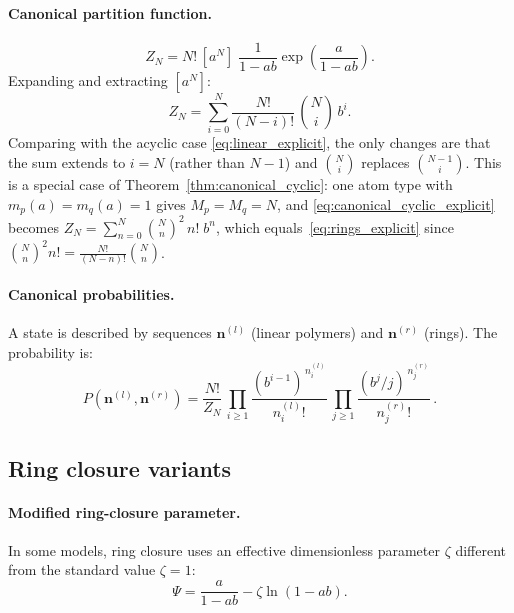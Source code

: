 \documentclass[11pt]{amsart}
\newcommand{\GFensemble}{Z}
\newcommand{\GFcomb}{\Psi}
\theoremstyle{definition}
\theoremstyle{plain}
\theoremstyle{remark}
\begin{document}
\paragraph{Canonical partition function.}
\begin{equation}\label{eq:rings_partition}
\GFensemble_N = N!\,[a^N]\;\frac{1}{1-ab}\exp\!\left(\frac{a}{1-ab}\right).
\end{equation}
Expanding and extracting $[a^N]$:
\begin{equation}\label{eq:rings_explicit}
\GFensemble_N
=
\sum_{i=0}^{N}\frac{N!}{(N-i)!}\,\binom{N}{i}\,b^i.
\end{equation}
Comparing with the acyclic case \eqref{eq:linear_explicit}, the only changes are that the sum extends to $i=N$ (rather than $N-1$) and $\binom{N}{i}$ replaces $\binom{N-1}{i}$.
This is a special case of Theorem~\ref{thm:canonical_cyclic}: one atom type with $m_p(a)=m_q(a)=1$ gives $M_p=M_q=N$, and \eqref{eq:canonical_cyclic_explicit} becomes $\GFensemble_N = \sum_{n=0}^{N}\binom{N}{n}^2\,n!\;b^n$, which equals~\eqref{eq:rings_explicit} since $\binom{N}{n}^2 n! = \frac{N!}{(N-n)!}\binom{N}{n}$.

\paragraph{Canonical probabilities.}
A state is described by sequences $\mathbf{n}^{(l)}$ (linear polymers) and $\mathbf{n}^{(r)}$ (rings).
The probability is:
\[
P(\mathbf{n}^{(l)},\mathbf{n}^{(r)})
= \frac{N!}{\GFensemble_N}\,
\prod_{i\ge 1}\frac{(b^{i-1})^{\,n_i^{(l)}}}{n_i^{(l)}!}\,
\prod_{j\ge 1}\frac{(b^j/j)^{\,n_j^{(r)}}}{n_j^{(r)}!}\,.
\]

\subsection{Ring closure variants}
\label{sec:ring_closure_variants}

\paragraph{Modified ring-closure parameter.}
In some models, ring closure uses an effective dimensionless parameter $\zeta$ different from the standard value $\zeta=1$:
\begin{equation}\label{eq:cycles_with_c_solution}
\GFcomb = \frac{a}{1-ab} - \zeta\ln(1-ab).
\end{equation}
\end{document}

